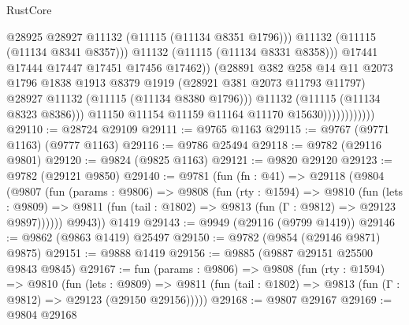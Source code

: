 \begin{lexlean}{RustCore}
\begin{coremodule}
                                        @28925
                                        @28927
                                        @11132
                                        (@11115 (@11134 @8351 @1796)))
                                      @11132
                                      (@11115 (@11134 @8341 @8357)))
                                    @11132
                                    (@11115 (@11134 @8331 @8358)))
                                  @17441
                                  @17444
                                  @17447
                                  @17451
                                  @17456
                                  @17462))
                              (@28891
                                @382
                                @258
                                @14
                                @11
                                @2073
                                @1796
                                @1838
                                @1913
                                @8379
                                @1919
                                (@28921 @381 @2073 @11793 @11797)
                                @28927
                                @11132
                                (@11115 (@11134 @8380 @1796)))
                              @11132
                              (@11115 (@11134 @8323 @8386)))
                            @11150
                            @11154
                            @11159
                            @11164
                            @11170
                            @15630))))))))))))
@29110 := @28724 @29109
@29111 := @9765 @1163
@29115 := @9767 (@9771 @1163) (@9777 @1163)
@29116 := @9786 @25494
@29118 := @9782 (@29116 @9801)
@29120 := @9824 (@9825 @1163)
@29121 := @9820 @29120
@29123 := @9782 (@29121 @9850)
@29140 := @9781
    (fun (fn : @41) =>
    @29118
      (@9804
        (@9807
          (fun (params : @9806) =>
          @9808
            (fun (rty : @1594) =>
            @9810
              (fun (lets : @9809) =>
              @9811 (fun (tail : @1802) => @9813 (fun (Γ : @9812) => @29123 @9897))))))
        @9943))
    @1419
@29143 := @9949 (@29116 (@9799 @1419))
@29146 := @9862 (@9863 @1419) @25497
@29150 := @9782 (@9854 (@29146 @9871) @9875)
@29151 := @9888 @1419
@29156 := @9885 (@9887 @29151 @25500 @9843 @9845)
@29167 := fun (params : @9806) =>
  @9808
    (fun (rty : @1594) =>
    @9810
      (fun (lets : @9809) =>
      @9811 (fun (tail : @1802) => @9813 (fun (Γ : @9812) => @29123 (@29150 @29156)))))
@29168 := @9807 @29167
@29169 := @9804 @29168

\end{coremodule}
\end{lexlean}
